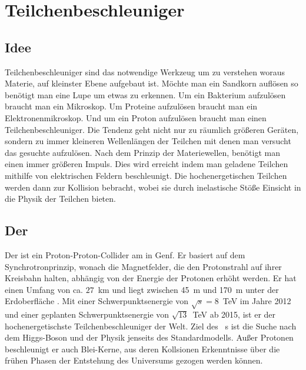 \section{Teilchenbeschleuniger}
\subsection{Idee}
Teilchenbeschleuniger sind das notwendige Werkzeug um zu verstehen woraus Materie, auf kleinster Ebene aufgebaut ist. Möchte man ein Sandkorn auflösen so benötigt man eine Lupe um etwas zu erkennen. Um ein Bakterium aufzulösen braucht man ein Mikroskop. Um Proteine aufzulösen braucht man ein Elektronenmikroskop. Und um ein Proton aufzulösen braucht man einen Teilchenbeschleuniger. Die Tendenz geht nicht nur zu räumlich größeren Geräten, sondern zu immer kleineren Wellenlängen der Teilchen mit denen man versucht das gesuchte aufzulösen. Nach dem Prinzip der Materiewellen, benötigt man einen immer größeren Impuls. Dies wird erreicht indem man geladene Teilchen mithilfe von elektrischen Feldern beschleunigt. Die hochenergetischen Teilchen werden dann zur Kollision bebracht, wobei sie durch inelastische Stöße Einsicht in die Physik der Teilchen bieten.

\subsection{Der \lhc}
Der \lhc ist ein Proton-Proton-Collider am \cern in Genf. Er basiert auf dem Synchrotronprinzip, wonach die Magnetfelder, die den Protonstrahl auf ihrer Kreisbahn halten, abhängig von der Energie der Protonen erhöht werden. Er hat einen Umfang von ca. $27$~km und liegt zwischen 45~m und 170~m unter der Erdoberfläche \cite{1748-0221-3-08-S08001}. Mit einer Schwerpunktsenergie von $\sqrt{s} = 8$~TeV im Jahre 2012 und einer geplanten Schwerpunktsenergie von $\sqrt{13}$~TeV ab 2015, ist er der hochenergetischste Teilchenbeschleuniger der Welt. Ziel des \lhc\ s ist die Suche nach dem Higgs-Boson und der Physik jenseits des Standardmodells.
Außer Protonen beschleunigt er auch Blei-Kerne, aus deren Kollsionen Erkenntnisse über die frühen Phasen der Entstehung des Universums gezogen werden können. 


